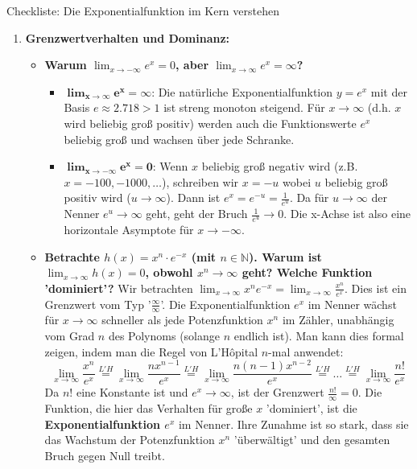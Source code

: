 \begin{loesungsumgebung}{Checkliste: Die Exponentialfunktion im Kern verstehen}
\begin{enumerate}[label=(\alph*)]
    \item \textbf{Grenzwertverhalten und Dominanz:}
    \begin{itemize}
        \item \textbf{Warum $\lim_{x \to -\infty} e^x = 0$, aber $\lim_{x \to \infty} e^x = \infty$?}
        \begin{itemize}
            \item $\mathbf{\lim_{x \to \infty} e^x = \infty}$: Die natürliche Exponentialfunktion $y=e^x$ mit der Basis $e \approx 2.718 > 1$ ist streng monoton steigend. Für $x \to \infty$ (d.h. $x$ wird beliebig groß positiv) werden auch die Funktionswerte $e^x$ beliebig groß und wachsen über jede Schranke.
            \item $\mathbf{\lim_{x \to -\infty} e^x = 0}$: Wenn $x$ beliebig groß negativ wird (z.B. $x=-100, -1000, \dots$), schreiben wir $x=-u$ wobei $u$ beliebig groß positiv wird ($u \to \infty$). Dann ist $e^x = e^{-u} = \frac{1}{e^u}$. Da für $u \to \infty$ der Nenner $e^u \to \infty$ geht, geht der Bruch $\frac{1}{e^u} \to 0$. Die x-Achse ist also eine horizontale Asymptote für $x \to -\infty$.
        \end{itemize}
        \item \textbf{Betrachte $h(x) = x^n \cdot e^{-x}$ (mit $n \in \mathbb{N}$). Warum ist $\lim_{x \to \infty} h(x) = 0$, obwohl $x^n \to \infty$ geht? Welche Funktion 'dominiert'?}
        Wir betrachten $\lim_{x \to \infty} x^n e^{-x} = \lim_{x \to \infty} \frac{x^n}{e^x}$.
        Dies ist ein Grenzwert vom Typ '$\frac{\infty}{\infty}$'. Die Exponentialfunktion $e^x$ im Nenner wächst für $x \to \infty$ schneller als jede Potenzfunktion $x^n$ im Zähler, unabhängig vom Grad $n$ des Polynoms (solange $n$ endlich ist).
        Man kann dies formal zeigen, indem man die Regel von L'Hôpital $n$-mal anwendet:
        $$ \lim_{x \to \infty} \frac{x^n}{e^x} \stackrel{L'H}{=} \lim_{x \to \infty} \frac{nx^{n-1}}{e^x} \stackrel{L'H}{=} \lim_{x \to \infty} \frac{n(n-1)x^{n-2}}{e^x} \stackrel{L'H}{=} \dots \stackrel{L'H}{=} \lim_{x \to \infty} \frac{n!}{e^x} $$
        Da $n!$ eine Konstante ist und $e^x \to \infty$, ist der Grenzwert $\frac{n!}{\infty} = 0$.
        Die Funktion, die hier das Verhalten für große $x$ 'dominiert', ist die \textbf{Exponentialfunktion $e^x$} im Nenner. Ihre Zunahme ist so stark, dass sie das Wachstum der Potenzfunktion $x^n$ 'überwältigt' und den gesamten Bruch gegen Null treibt.
    \end{itemize}
\end{enumerate}

\end{loesungsumgebung}





